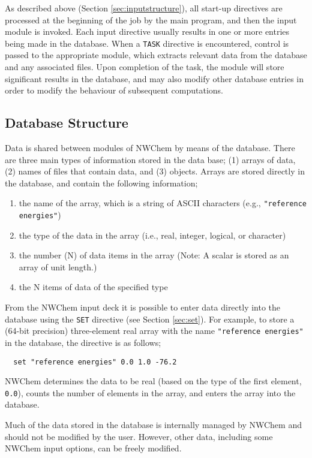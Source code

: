 As described above (Section \ref{sec:inputstructure}), all
start-up directives are processed at the beginning of the job
by the main program, and
then the input module is invoked.  Each input directive usually
results in one or more entries being made in the database.  When a
\verb+TASK+ directive is encountered, control is passed to the
appropriate module, which extracts relevant data from the database and
any associated files.  Upon completion of the task, the module will store
significant results in the database, and may also modify other
database entries in order to modify the behaviour of subsequent
computations.

\subsection{Database Structure}
\label{sec:database}

Data is shared between modules of NWChem by means of the database.  There
are three main types of information stored in the data base; (1) arrays of
data, (2) names of files that contain data, and (3) objects.  
Arrays are stored directly in the database, and contain the following
information;
\begin{enumerate}
\item the name of the array, which is a string of ASCII characters (e.g., 
      \verb+"reference energies"+)
\item the type of the data in the array 
(i.e., real, integer, logical, or character) 
\item the number (N) of data items in the array (Note: A scalar is stored as an array of unit length.)
\item the N items of data of the specified type
\end{enumerate}


From the NWChem input deck it is possible to enter data directly into
the database using the \verb+SET+ directive (see Section
\ref{sec:set}).  For example, to store a (64-bit precision)
three-element real array with the name \verb+"reference energies"+ in
the database, the directive is as follows;
\begin{verbatim}
  set "reference energies" 0.0 1.0 -76.2
\end{verbatim}
NWChem determines the data to be real (based on the type of the first
element, \verb+0.0+), counts the number
of elements in the array, and enters the array into the database.

Much of the data stored in the database is internally managed by
NWChem and should not be modified by the user.  However, other data,
including some NWChem input options, can be freely modified.  

